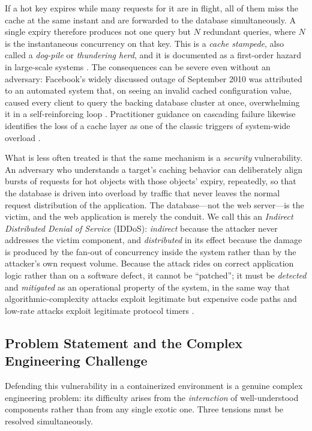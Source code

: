 \documentclass[preprint,12pt]{elsarticle}
\begin{document}
If a hot key expires while many requests for it are in flight, all of them miss the
cache at the same instant and are forwarded to the database simultaneously. A single
expiry therefore produces not one query but $N$ redundant queries, where $N$ is the
instantaneous concurrency on that key. This is a \emph{cache stampede}, also called a
\emph{dog-pile} or \emph{thundering herd}, and it is documented as a first-order hazard
in large-scale systems \cite{vattani2015,nishtala2013}. The consequences can be
severe even without an adversary: Facebook's widely discussed outage of September 2010
was attributed to an automated system that, on seeing an invalid cached configuration
value, caused every client to query the backing database cluster at once, overwhelming
it in a self-reinforcing loop \cite{johnson2010}. Practitioner guidance on cascading
failure likewise identifies the loss of a cache layer as one of the classic triggers of
system-wide overload \cite{beyer2016}.

What is less often treated is that the same mechanism is a \emph{security}
vulnerability. An adversary who understands a target's caching behavior can
deliberately align bursts of requests for hot objects with those objects' expiry,
repeatedly, so that the database is driven into overload by traffic that never leaves
the normal request distribution of the application. The database---not the web
server---is the victim, and the web application is merely the conduit. We call this
an \emph{Indirect Distributed Denial of Service} (IDDoS): \emph{indirect} because the
attacker never addresses the victim component, and \emph{distributed} in its effect
because the damage is produced by the fan-out of concurrency inside the system rather
than by the attacker's own request volume. Because the attack rides on correct
application logic rather than on a software defect, it cannot be ``patched''; it must
be \emph{detected} and \emph{mitigated} as an operational property of the system, in
the same way that algorithmic-complexity attacks exploit legitimate but expensive code
paths \cite{crosby2003} and low-rate attacks exploit legitimate protocol timers
\cite{kuzmanovic2003}.

\subsection{Problem Statement and the Complex Engineering Challenge}
Defending this vulnerability in a containerized environment is a genuine complex
engineering problem: its difficulty arises from the \emph{interaction} of
well-understood components rather than from any single exotic one. Three tensions
must be resolved simultaneously.
\end{document}
